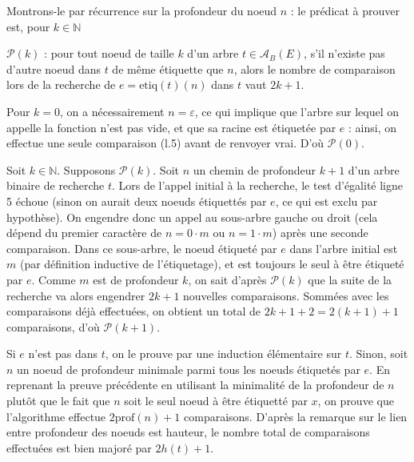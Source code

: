 \documentclass{scrartcl}
\begin{document}
			\begin{demo}
				\item Montrons-le par récurrence sur la profondeur du noeud $n$ : le prédicat à prouver est, pour $k \in \mathbb{N}$
				\begin{center}
					$\mathcal{P}(k)$ : pour tout noeud de taille $k$ d'un arbre $t \in \mathscr{A}_B(E)$, s'il n'existe pas d'autre noeud dans $t$ de même étiquette que $n$,
					alors le nombre de comparaison lors de la recherche de $e = \mathrm{etiq}(t)(n)$ dans $t$ vaut $2k+1$.
				\end{center}
				\item Pour $k=0$, on a nécessairement $n = \varepsilon$, ce qui implique que l'arbre sur lequel on appelle la fonction n'est pas vide,
					et que sa racine est étiquetée par $e$ : ainsi, on effectue une seule comparaison (l.5) avant de renvoyer vrai. D'où $\mathcal{P}(0)$.
				\item Soit $k \in \mathbb{N}$. Supposons $\mathcal{P}(k)$. Soit $n$ un chemin de profondeur $k+1$ d'un arbre binaire de recherche $t$.
					Lors de l'appel initial à la recherche, le test d'égalité ligne 5 échoue (sinon on aurait deux noeuds étiquettés par $e$, ce qui est exclu par hypothèse).
					On engendre donc un appel au sous-arbre gauche ou droit (cela dépend du premier caractère de $n = 0\cdot m$ ou $n = 1\cdot m$) après une seconde comparaison.
					Dans ce sous-arbre, le noeud étiqueté par $e$ dans l'arbre initial est $m$ (par définition inductive de l'étiquetage), et est toujours le seul à être étiqueté par $e$.
					Comme $m$ est de profondeur $k$, on sait d'après $\mathcal{P}(k)$ que la suite de la recherche va alors engendrer $2k+1$ nouvelles comparaisons.
					Sommées avec les comparaisons déjà effectuées, on obtient un total de $2k+1+2 = 2(k+1) + 1$ comparaisons, d'où $\mathcal{P}(k+1)$.
			\end{demo}

			\begin{demo}
				\item Si $e$ n'est pas dans $t$, on le prouve par une induction élémentaire sur $t$. 
					Sinon, soit $n$ un noeud de profondeur minimale parmi tous les noeuds étiquetés par $e$.
					En reprenant la preuve précédente en utilisant la minimalité de la profondeur de $n$ plutôt que le fait que $n$ soit le seul noeud à être étiquetté par $x$,
					on prouve que l'algorithme effectue $2\mathrm{prof}(n)+1$ comparaisons. D'après la remarque sur le lien entre profondeur des noeuds est hauteur,
					le nombre total de comparaisons effectuées est bien majoré par $2h(t)+1$.
			\end{demo}
\end{document}
